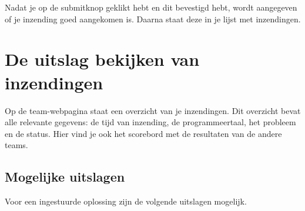 Nadat je op de submitknop geklikt hebt en dit bevestigd hebt, wordt
aangegeven of je inzending goed aangekomen is. Daarna staat deze in je
lijst met inzendingen.

\section{De uitslag bekijken van inzendingen}

Op de team-webpagina staat een overzicht van je inzendingen.
Dit overzicht bevat alle relevante gegevens: de tijd van inzending, de
programmeertaal, het probleem en de status. Hier vind je ook het scorebord
met de resultaten van de andere teams.

\subsection{Mogelijke uitslagen}

Voor een ingestuurde oplossing zijn de volgende uitslagen mogelijk.


